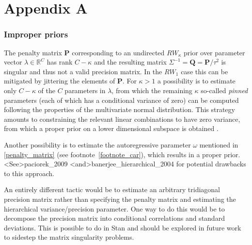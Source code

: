 \chapter*{Appendix A}\label{AppendixA}
\vspace{-1.75cm}
\subsection{Improper priors}

The penalty matrix $\mathbf{P}$ corresponding to an undirected $RW_\kappa$ prior over 
parameter vector $\lambda \in \mathbb{R}^C$ has rank $C - \kappa$ and the resulting 
matrix $\Sigma^{-1} = \mathbf{Q} = \mathbf{P}/\tau^2$ is singular and thus not a valid precision 
matrix. In the $RW_1$ case this can be mitigated by jittering the elements of $\mathbf{P}$. 
For $\kappa > 1$ a possibility is to estimate only $C - \kappa$ of the $C$ parameters in $\lambda$,  
from which the remaining $\kappa$ so-called {\it pinned} parameters (each of which has a 
conditional variance of zero) can be computed following the properties of the multivariate 
normal distribution. This strategy amounts to  constraining the relevant linear combinations 
to have zero variance, from which a proper prior on a lower dimensional subspace is 
obtained . 

Another possibility is to estimate the autoregressive parameter $\omega$ mentioned 
in \ref{penalty_matrix} (see footnote~\ref{footnote_car}), which results in a proper prior.
\citeA<See>{paciorek_2009} \citeA<and>{banerjee_hierarchical_2004} for potential
drawbacks to this approach.

An entirely different tactic would be to estimate an arbitrary tridiagonal precision matrix 
rather than specifying the penalty matrix and estimating the hierarchical variance/precision 
parameter. One way to do this would be to decompose the precision matrix into conditional 
correlations and standard deviations. This is possible to do in Stan and should be explored 
in future work to sidestep the matrix singularity problems. 





